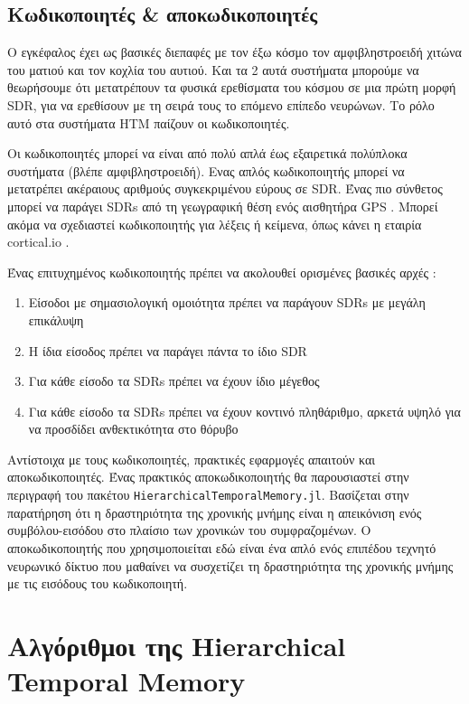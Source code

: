 \subsection{Κωδικοποιητές \& αποκωδικοποιητές}

	Ο εγκέφαλος έχει ως βασικές διεπαφές με τον έξω κόσμο τον αμφιβληστροειδή χιτώνα του ματιού και τον κοχλία του αυτιού.
	Και τα 2 αυτά συστήματα μπορούμε να θεωρήσουμε ότι μετατρέπουν τα φυσικά ερεθίσματα του κόσμου σε μια πρώτη μορφή SDR,
	για να ερεθίσουν με τη σειρά τους το επόμενο επίπεδο νευρώνων.
	Το ρόλο αυτό στα συστήματα HTM παίζουν οι κωδικοποιητές.

	Οι κωδικοποιητές μπορεί να είναι από πολύ απλά έως εξαιρετικά πολύπλοκα συστήματα (βλέπε αμφιβληστροειδή).
	Ενας απλός κωδικοποιητής μπορεί να μετατρέπει ακέραιους αριθμούς συγκεκριμένου εύρους σε SDR.
	Ένας πιο σύνθετος μπορεί να παράγει SDRs από τη γεωγραφική θέση ενός αισθητήρα GPS \parencite{purdyEncodingDataHTM2016}.
	Μπορεί ακόμα να σχεδιαστεί κωδικοποιητής για λέξεις ή κείμενα, όπως κάνει η εταιρία cortical.io \parencite{semantic}.

	Ένας επιτυχημένος κωδικοποιητής πρέπει να ακολουθεί ορισμένες βασικές αρχές \parencite{purdyEncodingDataHTM2016}:
	\begin{enumerate}
		\item Είσοδοι με σημασιολογική ομοιότητα πρέπει να παράγουν SDRs με μεγάλη επικάλυψη
		\item Η ίδια είσοδος πρέπει να παράγει πάντα το ίδιο SDR
		\item Για κάθε είσοδο τα SDRs πρέπει να έχουν ίδιο μέγεθος
		\item Για κάθε είσοδο τα SDRs πρέπει να έχουν κοντινό πληθάριθμο, αρκετά υψηλό για να προσδίδει ανθεκτικότητα στο θόρυβο
	\end{enumerate}

	Αντίστοιχα με τους κωδικοποιητές, πρακτικές εφαρμογές απαιτούν και αποκωδικοποιητές.
	Ένας πρακτικός αποκωδικοποιητής θα παρουσιαστεί στην περιγραφή του πακέτου \texttt{HierarchicalTemporalMemory.jl}.
	Βασίζεται στην παρατήρηση ότι η δραστηριότητα της χρονικής μνήμης είναι η απεικόνιση ενός συμβόλου-εισόδου στο πλαίσιο των χρονικών του συμφραζομένων.
	Ο αποκωδικοποιητής που χρησιμοποιείται εδώ είναι ένα απλό ενός επιπέδου τεχνητό νευρωνικό δίκτυο που μαθαίνει να συσχετίζει
	τη δραστηριότητα της χρονικής μνήμης με τις εισόδους του κωδικοποιητή.


\section{Αλγόριθμοι της Hierarchical Temporal Memory}

